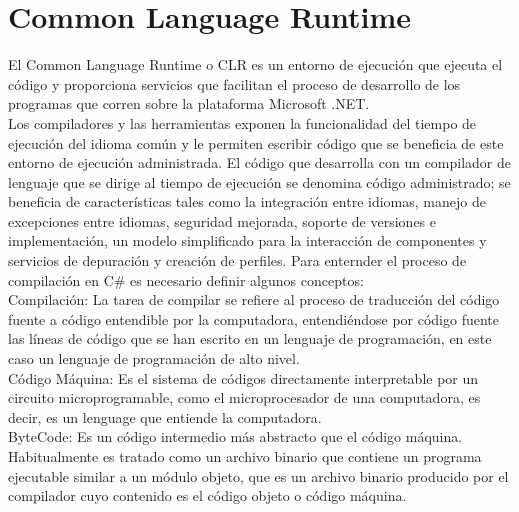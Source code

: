 \documentclass[12pt,a4paper]{report}
\begin{document}
\section{Common Language Runtime}
El Common Language Runtime o CLR es un entorno de ejecución que ejecuta el código y proporciona servicios que facilitan el proceso de desarrollo de los programas que corren sobre la plataforma Microsoft .NET.\\Los compiladores y las herramientas exponen la funcionalidad del tiempo de ejecución del idioma común y le permiten escribir código que se beneficia de este entorno de ejecución administrada. El código que desarrolla con un compilador de lenguaje que se dirige al tiempo de ejecución se denomina código administrado; se beneficia de características tales como la integración entre idiomas, manejo de excepciones entre idiomas, seguridad mejorada, soporte de versiones e implementación, un modelo simplificado para la interacción de componentes y servicios de depuración y creación de perfiles. Para enternder el proceso de compilación en C\# es necesario definir algunos conceptos:\\Compilación: La tarea de compilar se refiere al proceso de traducción del código fuente a código entendible por la computadora, entendiéndose por código fuente las líneas de código que se han escrito en un lenguaje de programación, en este caso un lenguaje de programación de alto nivel.\\Código Máquina: Es el sistema de códigos directamente interpretable por un circuito microprogramable, como el microprocesador de una computadora, es decir, es un lenguage que entiende la computadora.\\ByteCode: Es un código intermedio más abstracto que el código máquina. Habitualmente es tratado como un archivo binario que contiene un programa ejecutable similar a un módulo objeto, que es un archivo binario producido por el compilador cuyo contenido es el código objeto o código máquina.\\
\end{document}
